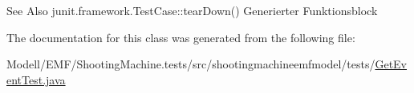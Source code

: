 \begin{DoxySeeAlso}{See Also}
junit.\-framework.\-Test\-Case\-::tear\-Down() Generierter Funktionsblock 
\end{DoxySeeAlso}


The documentation for this class was generated from the following file\-:\begin{DoxyCompactItemize}
\item 
Modell/\-E\-M\-F/\-Shooting\-Machine.\-tests/src/shootingmachineemfmodel/tests/\hyperlink{_get_event_test_8java}{Get\-Event\-Test.\-java}\end{DoxyCompactItemize}
